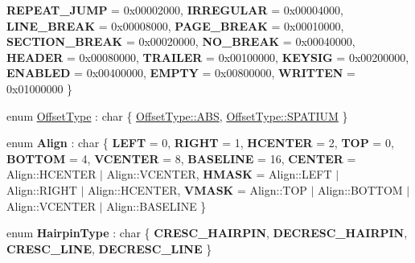 \begin{DoxyCompactItemize}
{\bfseries R\+E\+P\+E\+A\+T\+\_\+\+J\+U\+MP} = 0x00002000, 
{\bfseries I\+R\+R\+E\+G\+U\+L\+AR} = 0x00004000, 
{\bfseries L\+I\+N\+E\+\_\+\+B\+R\+E\+AK} = 0x00008000, 
\newline
{\bfseries P\+A\+G\+E\+\_\+\+B\+R\+E\+AK} = 0x00010000, 
{\bfseries S\+E\+C\+T\+I\+O\+N\+\_\+\+B\+R\+E\+AK} = 0x00020000, 
{\bfseries N\+O\+\_\+\+B\+R\+E\+AK} = 0x00040000, 
{\bfseries H\+E\+A\+D\+ER} = 0x00080000, 
\newline
{\bfseries T\+R\+A\+I\+L\+ER} = 0x00100000, 
{\bfseries K\+E\+Y\+S\+IG} = 0x00200000, 
{\bfseries E\+N\+A\+B\+L\+ED} = 0x00400000, 
{\bfseries E\+M\+P\+TY} = 0x00800000, 
\newline
{\bfseries W\+R\+I\+T\+T\+EN} = 0x01000000
 \}
\item 
enum \hyperlink{namespace_ms_afe84fbdef0df9b3922d749984380e57a}{Offset\+Type} \+: char \{ \hyperlink{namespace_ms_afe84fbdef0df9b3922d749984380e57aa7d8a220d2262f9d6c658d549ee12cf2c}{Offset\+Type\+::\+A\+BS}, 
\hyperlink{namespace_ms_afe84fbdef0df9b3922d749984380e57aa3b6c9bb5569049013d48cbaea675d20b}{Offset\+Type\+::\+S\+P\+A\+T\+I\+UM}
 \}
\item 
\mbox{\label{namespace_ms_a94b50213647d6de824820f47673bd500}} 
enum {\bfseries Align} \+: char \{ \newline
{\bfseries L\+E\+FT} = 0, 
{\bfseries R\+I\+G\+HT} = 1, 
{\bfseries H\+C\+E\+N\+T\+ER} = 2, 
{\bfseries T\+OP} = 0, 
\newline
{\bfseries B\+O\+T\+T\+OM} = 4, 
{\bfseries V\+C\+E\+N\+T\+ER} = 8, 
{\bfseries B\+A\+S\+E\+L\+I\+NE} = 16, 
{\bfseries C\+E\+N\+T\+ER} = Align\+:\+:H\+C\+E\+N\+T\+ER $\vert$ Align\+:\+:V\+C\+E\+N\+T\+ER, 
\newline
{\bfseries H\+M\+A\+SK} = Align\+:\+:L\+E\+FT $\vert$ Align\+:\+:R\+I\+G\+HT $\vert$ Align\+:\+:H\+C\+E\+N\+T\+ER, 
{\bfseries V\+M\+A\+SK} = Align\+:\+:T\+OP $\vert$ Align\+:\+:B\+O\+T\+T\+OM $\vert$ Align\+:\+:V\+C\+E\+N\+T\+ER $\vert$ Align\+:\+:B\+A\+S\+E\+L\+I\+NE
 \}
\item 
\mbox{\label{namespace_ms_a30101f0d829e75057ef152e28703f46f}} 
enum {\bfseries Hairpin\+Type} \+: char \{ {\bfseries C\+R\+E\+S\+C\+\_\+\+H\+A\+I\+R\+P\+IN}, 
{\bfseries D\+E\+C\+R\+E\+S\+C\+\_\+\+H\+A\+I\+R\+P\+IN}, 
{\bfseries C\+R\+E\+S\+C\+\_\+\+L\+I\+NE}, 
{\bfseries D\+E\+C\+R\+E\+S\+C\+\_\+\+L\+I\+NE}
 \}
\item 
\mbox{\label{namespace_ms_a580c1280cec7447cc508f8d15bfd001c}} 

\end{DoxyCompactItemize}
